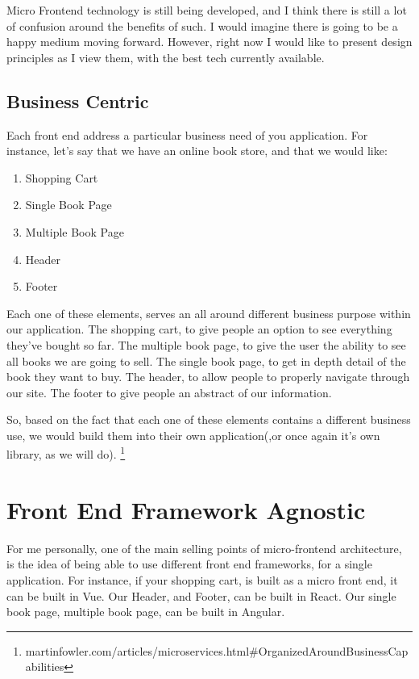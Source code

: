 Micro Frontend technology is still being developed, and I think there is still a lot of confusion around the benefits of such. I would imagine there is going to be a happy medium moving forward. However, right now I would like to present design principles as I view them, with the best tech currently available. 

\subsection{Business Centric}
Each front end address a particular business need of you application.
For instance, let's say that we have an online book store, and that we would like:
\begin{enumerate}
  \item Shopping Cart
  \item Single Book Page
  \item Multiple Book Page
  \item Header
  \item Footer 
\end{enumerate}

Each one of these elements, serves an all around different business purpose within our application. The shopping cart, to give people an option to see everything they've bought so far. The multiple book page, to give the user the ability to see all books we are going to sell. The single book page, to get in depth detail of the book they want to buy. The header, to allow people to properly navigate through our site. The footer to give people an abstract of our information. 

So, based on the fact that each one of these elements contains a different business use, we would build them into their own application(,or once again it's own library, as we will do). \footnote{martinfowler.com/articles/microservices.html\#OrganizedAroundBusinessCapabilities}

\section{Front End Framework Agnostic}
For me personally, one of the main selling points of micro-frontend architecture, is the idea of being able to use different front end frameworks, for a single application. For instance, if your shopping cart, is built as a micro front end, it can be built in Vue. Our Header, and Footer, can be built in React. Our single book page, multiple book page, can be built in Angular. 

